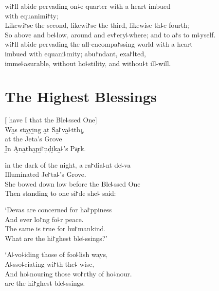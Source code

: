 \clearpage

 wi꜓ll abide pervading on꜕e quarter with a heart imbued\\
\vin with equanimi꜓ty;\\
Likewi꜓se the second, likewi꜓se the third, likewise th꜕e fourth;\\
So above and be꜕low, around and ev꜓ery꜕where; and to  a꜓s to m꜕yself.\\
 wi꜓ll abide pervading the all-encompa꜓ssing world with a heart \\
\vin imbued with equani꜕mity; abu꜓ndant, exa꜓lted,\\
\vin imme꜕asurable, without ho꜕stility, and withou꜕t ill-will.

\chapter{The Highest Blessings}


\begin{leader}
\end{leader}

[ have I  that the Ble꜕ssed One]\\
Wa̱s sta̮yi̱ng a̱t Sā̱꜓va̱꜕tthī͓,\\
 at the Jeta's Grove\\
I̱n A̮nā̱tha̮pi̱꜓ṇḍi̮ka̱꜕'s Pa͓rk.

 in the dark of the night, a ra꜓dia꜕nt de꜕va\\
Illuminated  Je꜓ta꜕'s Grove.\\
She bowed down low before the Ble꜕ssed One\\
Then standing to one si꜓de she꜕ said:

`Devas are concerned for ha꜓ppiness\\
And ever lo꜓ng fo꜕r peace.\\
The same is true for hu꜓mankind.\\
What  are the hi꜓ghest ble꜕ssings?'

`A꜕vo꜕iding those of foo꜕lish ways,\\
A꜕sso꜕ciating wi꜓th the꜕ wise,\\
And ho꜕nouring those wo꜓rthy of ho꜕nour.\\
 are the hi꜓ghest ble꜕ssings.


